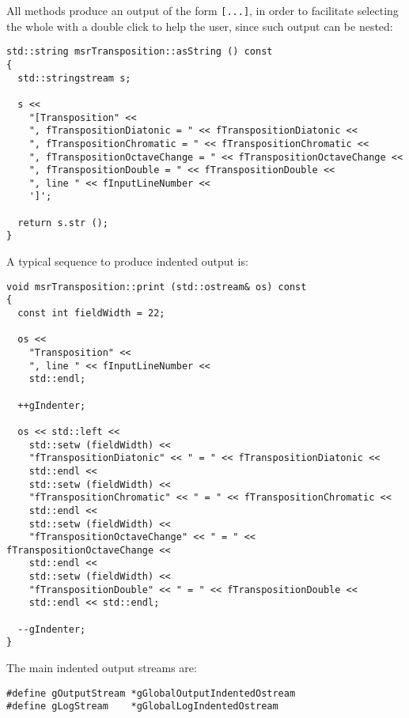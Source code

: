 All  methods produce an output of the form {\tt [...]}, in order to facilitate selecting the whole with a double click to help the user, since such output can be nested:
\begin{lstlisting}[language=CPlusPlus]
std::string msrTransposition::asString () const
{
  std::stringstream s;

  s <<
    "[Transposition" <<
    ", fTranspositionDiatonic = " << fTranspositionDiatonic <<
    ", fTranspositionChromatic = " << fTranspositionChromatic <<
    ", fTranspositionOctaveChange = " << fTranspositionOctaveChange <<
    ", fTranspositionDouble = " << fTranspositionDouble <<
    ", line " << fInputLineNumber <<
    ']';

  return s.str ();
}
\end{lstlisting}

A typical sequence to produce indented output is:
\begin{lstlisting}[language=CPlusPlus]
void msrTransposition::print (std::ostream& os) const
{
  const int fieldWidth = 22;

  os <<
    "Transposition" <<
    ", line " << fInputLineNumber <<
    std::endl;

  ++gIndenter;

  os << std::left <<
    std::setw (fieldWidth) <<
    "fTranspositionDiatonic" << " = " << fTranspositionDiatonic <<
    std::endl <<
    std::setw (fieldWidth) <<
    "fTranspositionChromatic" << " = " << fTranspositionChromatic <<
    std::endl <<
    std::setw (fieldWidth) <<
    "fTranspositionOctaveChange" << " = " << fTranspositionOctaveChange <<
    std::endl <<
    std::setw (fieldWidth) <<
    "fTranspositionDouble" << " = " << fTranspositionDouble <<
    std::endl << std::endl;

  --gIndenter;
}
\end{lstlisting}

The main indented output streams are:
\begin{lstlisting}[language=CPlusPlus]
#define gOutputStream *gGlobalOutputIndentedOstream
#define gLogStream    *gGlobalLogIndentedOstream

\end{lstlisting}


